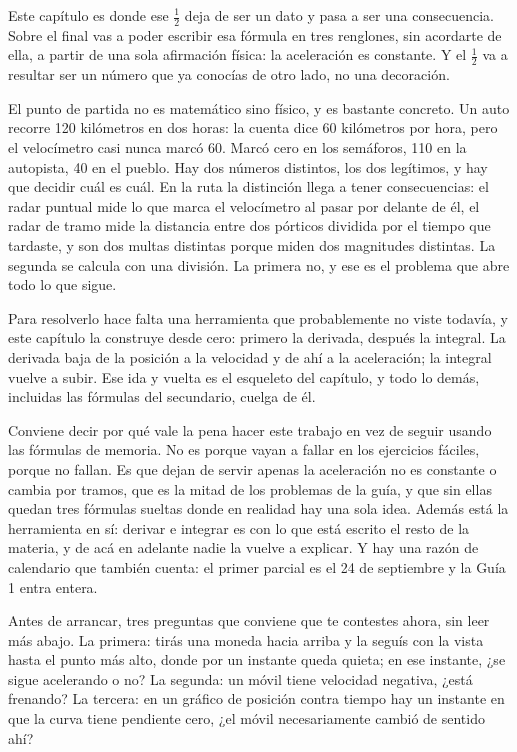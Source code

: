\documentclass[11pt,openany]{book}
\begin{document}
Este capítulo es donde ese $\tfrac12$ deja de ser un dato y pasa a ser una consecuencia. Sobre el final vas a poder escribir esa fórmula en tres renglones, sin acordarte de ella, a partir de una sola afirmación física: la aceleración es constante. Y el $\tfrac12$ va a resultar ser un número que ya conocías de otro lado, no una decoración.

El punto de partida no es matemático sino físico, y es bastante concreto. Un auto recorre 120 kilómetros en dos horas: la cuenta dice 60 kilómetros por hora, pero el velocímetro casi nunca marcó 60. Marcó cero en los semáforos, 110 en la autopista, 40 en el pueblo. Hay dos números distintos, los dos legítimos, y hay que decidir cuál es cuál. En la ruta la distinción llega a tener consecuencias: el radar puntual mide lo que marca el velocímetro al pasar por delante de él, el radar de tramo mide la distancia entre dos pórticos dividida por el tiempo que tardaste, y son dos multas distintas porque miden dos magnitudes distintas. La segunda se calcula con una división. La primera no, y ese es el problema que abre todo lo que sigue.

Para resolverlo hace falta una herramienta que probablemente no viste todavía, y este capítulo la construye desde cero: primero la derivada, después la integral. La derivada baja de la posición a la velocidad y de ahí a la aceleración; la integral vuelve a subir. Ese ida y vuelta es el esqueleto del capítulo, y todo lo demás, incluidas las fórmulas del secundario, cuelga de él.

Conviene decir por qué vale la pena hacer este trabajo en vez de seguir usando las fórmulas de memoria. No es porque vayan a fallar en los ejercicios fáciles, porque no fallan. Es que dejan de servir apenas la aceleración no es constante o cambia por tramos, que es la mitad de los problemas de la guía, y que sin ellas quedan tres fórmulas sueltas donde en realidad hay una sola idea. Además está la herramienta en sí: derivar e integrar es con lo que está escrito el resto de la materia, y de acá en adelante nadie la vuelve a explicar. Y hay una razón de calendario que también cuenta: el primer parcial es el 24 de septiembre y la Guía 1 entra entera.

Antes de arrancar, tres preguntas que conviene que te contestes ahora, sin leer más abajo. La primera: tirás una moneda hacia arriba y la seguís con la vista hasta el punto más alto, donde por un instante queda quieta; en ese instante, ¿se sigue acelerando o no? La segunda: un móvil tiene velocidad negativa, ¿está frenando? La tercera: en un gráfico de posición contra tiempo hay un instante en que la curva tiene pendiente cero, ¿el móvil necesariamente cambió de sentido ahí?
\end{document}

